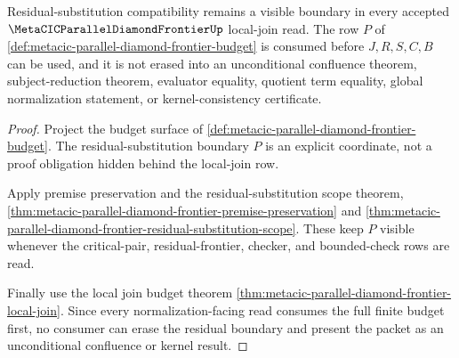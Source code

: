 \begin{theorem}
\label{thm:metacic-parallel-diamond-frontier-residual-boundary}
Residual-substitution compatibility remains a visible boundary in every accepted $\MetaCICParallelDiamondFrontierUp$ local-join read. The row $P$ of \autoref{def:metacic-parallel-diamond-frontier-budget} is consumed before $J,R,S,C,B$ can be used, and it is not erased into an unconditional confluence theorem, subject-reduction theorem, evaluator equality, quotient term equality, global normalization statement, or kernel-consistency certificate.
\end{theorem}
\begin{proof}
Project the budget surface of \autoref{def:metacic-parallel-diamond-frontier-budget}. The residual-substitution boundary $P$ is an explicit coordinate, not a proof obligation hidden behind the local-join row.

Apply premise preservation and the residual-substitution scope theorem, \autoref{thm:metacic-parallel-diamond-frontier-premise-preservation} and \autoref{thm:metacic-parallel-diamond-frontier-residual-substitution-scope}. These keep $P$ visible whenever the critical-pair, residual-frontier, checker, and bounded-check rows are read.

Finally use the local join budget theorem \autoref{thm:metacic-parallel-diamond-frontier-local-join}. Since every normalization-facing read consumes the full finite budget first, no consumer can erase the residual boundary and present the packet as an unconditional confluence or kernel result.
\end{proof}

